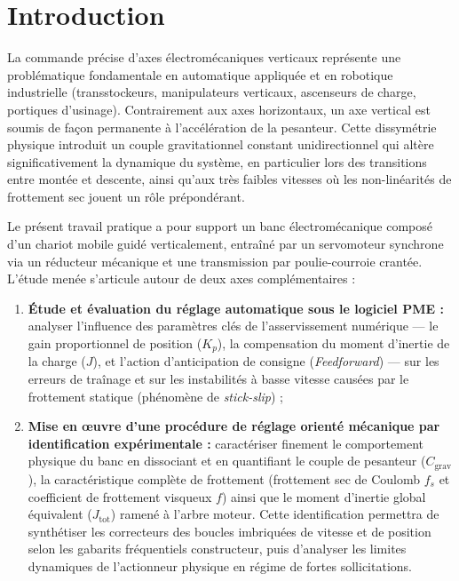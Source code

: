 \documentclass[12pt,a4paper]{article}
\begin{document}
\hypersetup{pageanchor=true}


\section*{Introduction}

La commande précise d'axes électromécaniques verticaux représente une problématique fondamentale en automatique appliquée et en robotique industrielle (transstockeurs, manipulateurs verticaux, ascenseurs de charge, portiques d'usinage). Contrairement aux axes horizontaux, un axe vertical est soumis de façon permanente à l'accélération de la pesanteur. Cette dissymétrie physique introduit un couple gravitationnel constant unidirectionnel qui altère significativement la dynamique du système, en particulier lors des transitions entre montée et descente, ainsi qu'aux très faibles vitesses où les non-linéarités de frottement sec jouent un rôle prépondérant.

Le présent travail pratique a pour support un banc électromécanique composé d'un chariot mobile guidé verticalement, entraîné par un servomoteur synchrone via un réducteur mécanique et une transmission par poulie-courroie crantée. L'étude menée s'articule autour de deux axes complémentaires :
\begin{enumerate}
    \item \textbf{Étude et évaluation du réglage automatique sous le logiciel PME :} analyser l'influence des paramètres clés de l'asservissement numérique --- le gain proportionnel de position ($K_p$), la compensation du moment d'inertie de la charge ($J$), et l'action d'anticipation de consigne (\textit{Feedforward}) --- sur les erreurs de traînage et sur les instabilités à basse vitesse causées par le frottement statique (phénomène de \textit{stick-slip}) ;
    \item \textbf{Mise en œuvre d'une procédure de réglage orienté mécanique par identification expérimentale :} caractériser finement le comportement physique du banc en dissociant et en quantifiant le couple de pesanteur ($C_{\text{grav}}$), la caractéristique complète de frottement (frottement sec de Coulomb $f_s$ et coefficient de frottement visqueux $f$) ainsi que le moment d'inertie global équivalent ($J_{\text{tot}}$) ramené à l'arbre moteur. Cette identification permettra de synthétiser les correcteurs des boucles imbriquées de vitesse et de position selon les gabarits fréquentiels constructeur, puis d'analyser les limites dynamiques de l'actionneur physique en régime de fortes sollicitations.
\end{enumerate}
\end{document}
